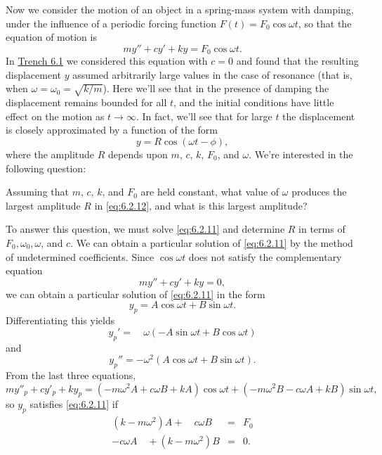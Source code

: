 \documentclass{ximera}
\begin{document}
Now we consider the motion of an object in a spring-mass system with
damping, under the influence of a periodic forcing function
$F(t)=F_0\cos\omega t$, so that the equation of motion is
\begin{equation}\label{eq:6.2.11}
my''+cy'+ky=F_0\cos\omega t.
\end{equation}
In \href{https://ximera.osu.edu/ode/main/springProblemsI/springProblemsI}{Trench 6.1} we considered this equation with $c=0$ and
found that the resulting displacement $y$ assumed arbitrarily large
values in the case of resonance   (that is, when
$\omega=\omega_0=\sqrt{k/m}$). Here we'll see that in the presence
of damping the displacement remains bounded for all $t$, and the
initial conditions have little effect on the motion as $t\rightarrow\infty$.
In fact, we'll see that for large $t$ the displacement is closely
approximated by a function of the form
\begin{equation}\label{eq:6.2.12}
y=R\cos(\omega t-\phi),
\end{equation}
where the amplitude $R$ depends upon $m$, $c$, $k$, $F_0$, and
$\omega$. We're interested in the following question:
 
\begin{question}Assuming that $m$, $c$, $k$, and $F_0$ are
held constant, what value of $\omega$ produces the largest amplitude
$R$ in \eqref{eq:6.2.12}, and what is this largest amplitude?
\end{question}
 
To answer this question, we must solve \eqref{eq:6.2.11} and determine $R$ in
terms of $F_0,\omega_0,\omega$, and $c$. We can obtain a particular
solution of \eqref{eq:6.2.11} by the method of undetermined coefficients.
Since $\cos\omega t$ does not satisfy the complementary equation
$$
my''+cy'+ky=0,
$$
we can obtain a particular solution of \eqref{eq:6.2.11} in the form
\begin{equation}\label{eq:6.2.13}
y_p=A\cos\omega t+B\sin\omega t.
\end{equation}
Differentiating this yields
$$
y_p'=\quad\omega (-A\sin\omega t+B\cos\omega t)
$$
and
$$
y_p''=-\omega^2(A\cos\omega t+B\sin\omega t).
$$
 From the last three equations,
$$
my''_p+cy'_p+ky_p=(-m\omega^2A+c\omega B+kA)\cos\omega t+
(-m\omega^2 B-c\omega A+kB)\sin\omega t,
$$
so $y_p$ satisfies  \eqref{eq:6.2.11}  if
$$
\begin{array}{lll}
(k-m\omega^2) A+\quad c\omega B &=&F_0\\
-c\omega A\quad+(k-m\omega^2)B&=&0.
\end{array}
$$
 
\end{document}
